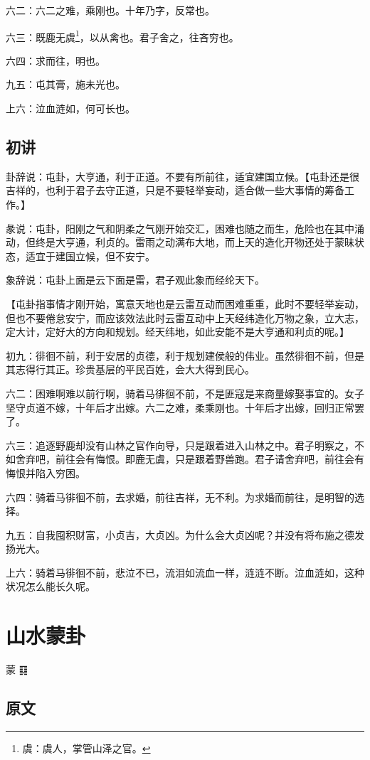 \documentclass[12pt,oneside]{book}
\begin{document}
六二：六二之难，乘刚也。十年乃字，反常也。

六三：既鹿无虞\footnote{虞：虞人，掌管山泽之官。}，以从禽也。君子舍之，往吝穷也。

六四：求而往，明也。

九五：屯其膏，施未光也。

上六：泣血涟如，何可长也。

\section{初讲}
卦辞说：屯卦，大亨通，利于正道。不要有所前往，适宜建国立候。【屯卦还是很吉祥的，也利于君子去守正道，只是不要轻举妄动，适合做一些大事情的筹备工作。】

彖说：屯卦，阳刚之气和阴柔之气刚开始交汇，困难也随之而生，危险也在其中涌动，但终是大亨通，利贞的。雷雨之动满布大地，而上天的造化开物还处于蒙昧状态，适宜于建国立候，但不安宁。

象辞说：屯卦上面是云下面是雷，君子观此象而经纶天下。

【屯卦指事情才刚开始，寓意天地也是云雷互动而困难重重，此时不要轻举妄动，但也不要倦怠安宁，而应该效法此时云雷互动中上天经纬造化万物之象，立大志，定大计，定好大的方向和规划。经天纬地，如此安能不是大亨通和利贞的呢。】

初九：徘徊不前，利于安居的贞德，利于规划建侯般的伟业。虽然徘徊不前，但是其志得行其正。珍贵基层的平民百姓，会大大得到民心。

六二：困难啊难以前行啊，骑着马徘徊不前，不是匪寇是来商量嫁娶事宜的。女子坚守贞道不嫁，十年后才出嫁。六二之难，柔乘刚也。十年后才出嫁，回归正常罢了。

六三：追逐野鹿却没有山林之官作向导，只是跟着进入山林之中。君子明察之，不如舍弃吧，前往会有悔恨。即鹿无虞，只是跟着野兽跑。君子请舍弃吧，前往会有悔恨并陷入穷困。

六四：骑着马徘徊不前，去求婚，前往吉祥，无不利。为求婚而前往，是明智的选择。

九五：自我囤积财富，小贞吉，大贞凶。为什么会大贞凶呢？并没有将布施之德发扬光大。

上六：骑着马徘徊不前，悲泣不已，流泪如流血一样，涟涟不断。泣血涟如，这种状况怎么能长久呢。



\chapter{山水蒙卦}
蒙 {\Large ䷃}

\section{原文}
\end{document}
